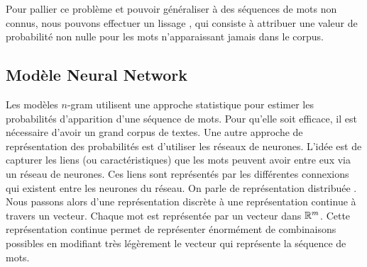 Pour pallier ce problème et pouvoir généraliser à des séquences de mots non connus, nous pouvons effectuer un \og lissage \fg{}, qui consiste à attribuer une valeur de probabilité non nulle pour les mots n'apparaissant jamais dans le corpus.

\subsection{Modèle Neural Network}

Les modèles $n$-gram utilisent une approche statistique pour estimer les probabilités d'apparition d'une séquence de mots. Pour qu'elle soit efficace, il est nécessaire d'avoir un grand corpus de textes.
Une autre approche de représentation des probabilités est d'utiliser les réseaux de neurones.
L'idée est de capturer les liens (ou caractéristiques) que les mots peuvent avoir entre eux via un réseau de neurones. Ces liens sont représentés par les différentes connexions qui existent entre les neurones du réseau.
On parle de \og représentation distribuée \fg{}.
Nous passons alors d'une représentation discrète à une représentation continue à travers un vecteur. 
Chaque mot est représentée par un vecteur dans $\mathbb{R}^m$. Cette représentation continue permet de représenter énormément de combinaisons possibles en modifiant très légèrement le vecteur qui représente la séquence de mots.



